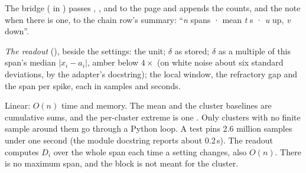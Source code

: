 The bridge ( in ) passes ,
,  and  to the page and appends the counts, and the
note when there is one, to the chain row's summary:
``\textit{n} spans · mean \textit{t} s · \textit{u} up, \textit{v} down''.

\emph{The readout} (), beside the settings: the unit; $\delta$ as stored; $\delta$
as a multiple of this span's median $|x_i - a_i|$, amber below $4\times$ (on white noise
about six standard deviations, by the adapter's docstring); the local window, the refractory
gap and the span per spike, each in samples and seconds.

Linear: $O(n)$ time and memory. The mean and the cluster baselines are cumulative sums, and
the per-cluster extreme is one . Only clusters with no finite
sample around them go through a Python loop. A test pins 2.6 million samples under one
second (the module docstring reports about 0.2\,s). The readout computes $D_i$ over the whole
span each time a setting changes, also $O(n)$. There is no maximum span, and the block is not
meant for the cluster.

